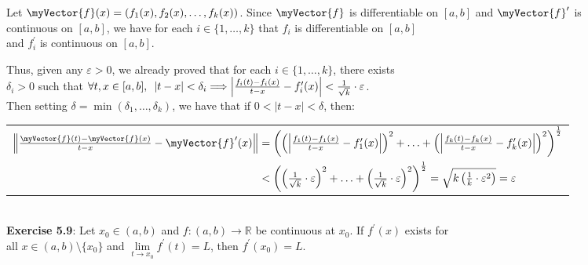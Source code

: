 \documentclass{book}
\newcommand{\pracTwo}{
   \color{Orange}%
   \fontsize{12}{14}\selectfont%
}
\newenvironment{myIndent}{%
   \begin{adjustwidth}{2.5em}{0em}%
}{%
   \end{adjustwidth}%
}
\newcommand{\myHS}{ \hspace{0.5em}}
\newcommand{\mySepTwo}[1][.]{%
   {\noindent\color{#1}{\rule{6.5in}{0.5mm}}}\\%
}
\newcommand{\retTwo}{\hfill\bigbreak}
\newcommand{\mVec}[1]{\myVector{#1}}
\begin{document}
\begin{myIndent}\pracTwo
   Let $\mVec{f}(x) = (f_1(x), f_2(x), \ldots, f_k(x))$. Since $\mVec{f}$ is differentiable on $[a, b]$ and $\mVec{f}^\prime$ is\\ continuous on $[a, b]$, we have for each $i \in \{1, \ldots, k\}$ that $f_i$ is differentiable on $[a, b]$\\ and $f_i^\prime$ is continuous on $[a, b]$.\retTwo

   Thus, given any $\varepsilon > 0$, we already proved that for each $i \in \{1, \ldots, k\}$, there exists\\ $\delta_i > 0$ such that $\forall t, x \in [a, b], \myHS |t - x| < \delta_i \Longrightarrow \left|\frac{f_i(t) - f_i(x)}{t - x} - f_i^\prime(x)\right| < \frac{1}{\sqrt{k}}\cdot \varepsilon$.\\ Then setting $\delta = \min(\delta_1, \ldots, \delta_k)$, we have that if $0 < |t - x| < \delta$, then:
   \begin{center}
      \begin{tabular}{l}
         $\left\|\frac{\mVec{f}(t) - \mVec{f}(x)}{t - x} - \mVec{f}^\prime(x)\right\| = \left(\left(\left|\frac{f_1(t) - f_1(x)}{t - x} - f_1^\prime(x)\right|\right)^2 + \ldots + \left(\left|\frac{f_k(t) - f_k(x)}{t - x} - f_k^\prime(x)\right|\right)^2\right)^{\frac{1}{2}}$\\

         $\phantom{\left\|\frac{\mVec{f}(t) - \mVec{f}(x)}{t - x} - \mVec{f}^\prime(x)\right\|} < \left( \left(\frac{1}{\sqrt{k}} \cdot \varepsilon\right)^2 + \ldots + \left(\frac{1}{\sqrt{k}} \cdot \varepsilon\right)^2\right)^{\frac{1}{2}} = \sqrt{k \left(\frac{1}{k} \cdot \varepsilon^2\right)} = \varepsilon$
      \end{tabular}\retTwo
   \end{center}
\end{myIndent}

\mySepTwo[Black]

\textbf{Exercise 5.9}: Let $x_0 \in (a, b)$ and $f: (a, b) \longrightarrow \mathbb{R}$ be continuous at $x_0$. If $f^\prime(x)$ exists for\\ all $x \in (a, b) \setminus \{x_0\}$ and $\lim\limits_{t\rightarrow x_0}f^\prime(t) = L$, then $f^\prime(x_0) = L$.\\ [-6pt]
\end{document}
